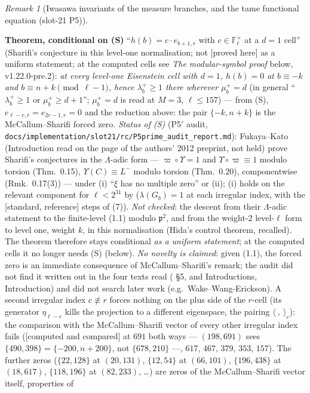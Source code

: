 \documentclass[11pt]{article}
\theoremstyle{remark}
\newtheorem{remark}[theorem]{Remark}
\newcommand{\F}{\mathbb{F}}
\newcommand{\PROVED}{\textsf{[proved here]}}
\newcommand{\STD}{\textsf{[standard, reference]}}
\newcommand{\CMPD}{\textsf{[computed and compared]}}   %
\begin{document}
\begin{remark}[Iwasawa invariants of the measure branches, and the tame functional equation (slot-21 P5)]
\begin{enumerate}
  \textbf{Theorem, conditional on (S)} ``$h(b)=c\cdot e_{b+1,r}$ with $c\in\F_\ell^{\times}$ at a $d=1$ cell'' (Sharifi's conjecture in this level-one normalisation; not \PROVED{} as a uniform statement; at the computed cells see \emph{The modular-symbol proof} below, v1.22.0-pre.2):
  \emph{at every level-one Eisenstein cell with $d=1$, $h(b)=0$ at $b\equiv-k$ and $b\equiv n+k\pmod{\ell-1}$, hence $\lambda^{+}_b\ge1$ there wherever $\mu^{+}_b=d$} (in general ``$\lambda^{+}_b\ge1$ or
  $\mu^{+}_b\ge d+1$''; $\mu^{+}_b=d$ is read at $M=3$, $\ell\le157$) --- from (S), $e_{\ell-r,r}=e_{2r-1,r}=0$ and the reduction above: the pair $\{-k,n+k\}$ is the McCallum--Sharifi forced zero.
  \emph{Status of (S)} (P5$'$ audit, \texttt{docs/implementation/slot21/rc/P5prime\_audit\_report.md}): Fukaya--Kato \cite{fukaya_kato} (Introduction read on the page of the authors' 2012 preprint, not held) prove Sharifi's
  conjectures in the $\Lambda$-adic form --- $\varpi\circ\Upsilon=1$ and $\Upsilon\circ\varpi\equiv1$ modulo torsion (Thm.~0.15), $\Upsilon(C)\equiv L^{-}$ modulo torsion (Thm.~0.20), componentwise (Rmk.~0.17(3)) --- under
  (i) ``$\xi$ has no multiple zero'' or (ii); (i) holds on the relevant component for $\ell<2^{31}$ by \cite{hho} ($\lambda(G_b)=1$ at each irregular index, with the \STD{} steps of (7)). \emph{Not checked}: the descent from
  their $\Lambda$-adic statement to the finite-level (1.1) modulo $\mathfrak p^{2}$, and from the weight-$2$ level-$\ell$ form to level one, weight $k$, in this normalisation (Hida's control theorem, recalled). The theorem therefore
  stays conditional \emph{as a uniform statement}; at the computed cells it no longer needs (S) (below). \emph{No novelty is claimed}: given (1.1), the forced zero is an immediate consequence of McCallum--Sharifi's remark; the audit did not find it written out in the four texts read
  (\cite{mccallum_sharifi} \S5, \cite{sharifi_eisenstein} and \cite{sharifi_reciprocity} Introductions, \cite{fukaya_kato} Introduction) and did not search later work (e.g.\ Wake--Wang-Erickson). A second irregular index $c\not\equiv r$ forces nothing on the plus side of the $r$-cell (its generator $\eta_{\ell-c}$ kills the projection to a different eigenspace,
  the pairing $\langle\ ,\ \rangle_c$): the comparison with the McCallum--Sharifi vector of every other irregular index fails (\CMPD{} at $691$ both ways --- $(198,691)$ sees $\{490,398\}=\{-200,n+200\}$, not $\{678,210\}$ ---, $617$, $467$, $379$, $353$, $157$).
  The further zeros ($\{22,128\}$ at $(20,131)$, $\{12,54\}$ at $(66,101)$, $\{196,438\}$ at $(18,617)$, $\{118,196\}$ at $(82,233)$, \dots) are zeros of the McCallum--Sharifi vector itself, properties of

\end{enumerate}
\end{remark}
\end{document}
